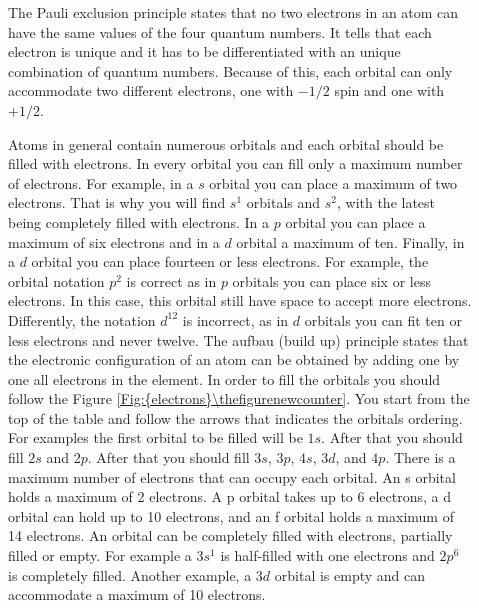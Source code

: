 \documentclass[main.tex]{subfiles}
\newcommand\chapterlabel{electrons}
\begin{document}
\begin{description}
\item[] 
The Pauli exclusion principle states that no two electrons in an atom can have the same values of the four quantum numbers. It tells that each electron is unique and it has to be differentiated with an unique combination of quantum numbers. Because of this, each orbital can only accommodate two different electrons, one with $-1/2$ spin and one with $+1/2$. 

\item[]     \label{Fig:{\chapterlabel}\thefigurenewcounter} 

Atoms in general contain numerous orbitals and each orbital should be filled with electrons. In every orbital you can fill only a maximum number of electrons. For example, in a $s$ orbital you can place a maximum of two electrons. That is why you will find $s^1$ orbitals and $s^2$, with the latest being completely filled with electrons. In a $p$ orbital you can place a maximum of six electrons and in a $d$ orbital a maximum of ten. Finally, in a $d$ orbital you can place fourteen or less electrons. For example, the orbital notation $p^2$ is correct as in $p$ orbitals you can place six or less electrons. In this case, this orbital still have space to accept more electrons. Differently, the notation $d^{12}$ is incorrect, as in $d$ orbitals you can fit ten or less electrons and never twelve. The aufbau (build up) principle states that the electronic configuration of an atom can be obtained by adding one by one all electrons in the element. In order to fill the orbitals you should follow the Figure \ref{Fig:{\chapterlabel}\thefigurenewcounter}. You start from the top of the table and follow the arrows that indicates the orbitals ordering. For examples the first orbital to be filled will be $1s$. After that you should fill  $2s$ and  $2p$. After that you should fill $3s$, $3p$, $4s$, $3d$, and $4p$. There is a maximum number of electrons that can occupy each orbital. An s orbital holds a maximum of 2 electrons. A p orbital takes up to 6 electrons, a d orbital can hold up to 10 electrons, and an f orbital holds a maximum of 14 electrons. An orbital can be completely filled with electrons, partially filled or empty. For example a $3s^1$ is half-filled with one electrons and $2p^6$ is completely filled. Another example, a $3d$ orbital is empty and can accommodate a maximum of 10 electrons.
\begin{marginfigure}

\end{marginfigure}
\end{description}
\end{document}
